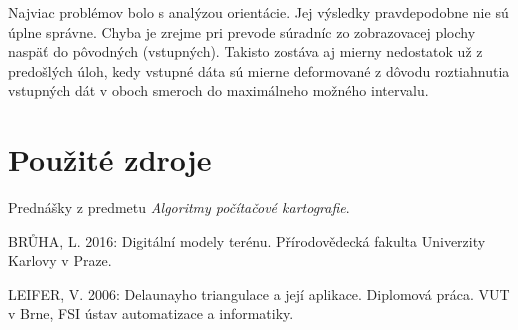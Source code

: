 \documentclass[11pt]{article}
\begin{document}
Najviac problémov bolo s analýzou orientácie. Jej výsledky pravdepodobne nie sú úplne správne. Chyba je zrejme pri prevode súradníc zo zobrazovacej plochy naspäť do pôvodných (vstupných). Takisto zostáva aj mierny nedostatok už z predošlých úloh, kedy vstupné dáta sú mierne deformované z dôvodu roztiahnutia vstupných dát v oboch smeroch do maximálneho možného intervalu.

\section{Použité zdroje}
Prednášky z predmetu \textit{Algoritmy počítačové kartografie}.

\noindent BRŮHA, L. 2016: Digitální modely terénu. Přírodovědecká fakulta Univerzity Karlovy v Praze.

\noindent LEIFER, V. 2006: Delaunayho triangulace a její aplikace. Diplomová práca. VUT v Brne, FSI ústav automatizace a informatiky.
\end{document}
